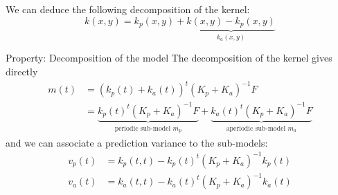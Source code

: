\documentclass{beamer}
\begin{document}
\begin{frame}{}
We can deduce the following decomposition of the kernel:
 \small
 \begin{equation*}
  k(x,y) = k_p(x,y) + \underbrace{k(x,y) - k_p(x,y)}_{k_a(x,y)}
 \end{equation*}
\begin{block}{Property: Decomposition of the model}
 The decomposition of the kernel gives directly
 \small
 \begin{equation*}
 \begin{split}
  m(t) & = (k_p(t) + k_a(t))^t (K_p+K_a)^{-1} F \\
  &  = \underbrace{k_p(t)^t (K_p+K_a)^{-1} F}_{\text{periodic sub-model }m_p} + \underbrace{k_a(t)^t (K_p+K_a)^{-1} F}_{\text{aperiodic sub-model }m_a}
 \end{split}
 \end{equation*}
 \normalsize
and we can associate a prediction variance to the sub-models:
\small
\begin{equation*}
\begin{split}
 v_p(t) & = k_p(t,t) - k_p(t)^t (K_p+K_a)^{-1} k_p(t) \\
 v_a(t) & = k_a(t,t) - k_a(t)^t (K_p+K_a)^{-1} k_a(t)
\end{split}
\end{equation*}
\end{block}
\end{frame}
\end{document}
